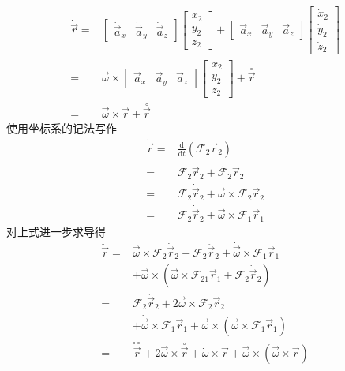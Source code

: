 \begin{align*}
    \dot{\vec{r}}
    =& \left[\begin{matrix}
        \dot{\vec{a}}_x & \dot{\vec{a}}_y & \dot{\vec{a}}_z
    \end{matrix}\right]
    \left[\begin{matrix}
        x_2 \\ y_2 \\ z_2
    \end{matrix}\right]
    + \left[\begin{matrix}
        \vec{a}_x & \vec{a}_y & \vec{a}_z
    \end{matrix}\right]
    \left[\begin{matrix}
        \dot{x}_2 \\ \dot{y}_2 \\ \dot{z}_2
    \end{matrix}\right] \\
    =& \vec{\omega}\times
    \left[\begin{matrix}
        \vec{a}_x & \vec{a}_y & \vec{a}_z
    \end{matrix}\right]
    \left[\begin{matrix}
        x_2 \\ y_2 \\ z_2
    \end{matrix}\right]
    + \overset{\circ}{\vec{r}} \\
    =& \vec{\omega}\times\vec{r} + \overset{\circ}{\vec{r}}
\end{align*}
使用坐标系的记法写作
\begin{align*}
    \dot{\vec{r}}
    =& \frac{\text{d}}{\text{d}t}(\mathcal{F}_2\vec{r}_2) \\
    =& \mathcal{F}_2\dot{\vec{r}}_2
    + \dot{\mathcal{F}_2}\vec{r}_2 \\
    =& \mathcal{F}_2\dot{\vec{r}}_2
    + \vec{\omega} \times \mathcal{F}_2\vec{r}_2 \\
    =& \mathcal{F}_2\dot{\vec{r}}_2
    + \vec{\omega} \times \mathcal{F}_1\vec{r}_1
\end{align*}
对上式进一步求导得
\begin{align*}
    \ddot{\vec{r}}
    =& \vec{\omega} \times \mathcal{F}_2\dot{\vec{r}}_2
    + \mathcal{F}_2\ddot{\vec{r}}_2
    + \dot{\vec{\omega}} \times \mathcal{F}_1\vec{r}_1 \\
    &+ \vec{\omega} \times (\vec{\omega} \times \mathcal{F}_21\vec{r}_1
    + \mathcal{F}_2\dot{\vec{r}}_2) \\
    =& \mathcal{F}_2\ddot{\vec{r}}_2
    + 2\vec{\omega} \times \mathcal{F}_2\dot{\vec{r}}_2 \\
    &+ \dot{\vec{\omega}} \times \mathcal{F}_1\vec{r}_1
    + \vec{\omega} \times (\vec{\omega} \times \mathcal{F}_1\vec{r}_1) \\
    =& \overset{\circ\circ}{\vec{r}}
    + 2\vec{\omega}\times\overset{\circ}{\vec{r}}
    + \dot{\omega}\times\vec{r}
    + \vec{\omega}\times(\vec{\omega}\times\vec{r})
\end{align*}
